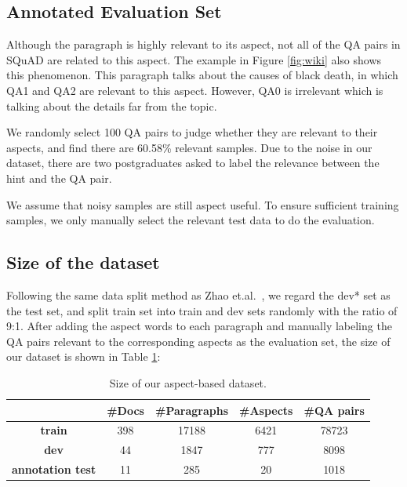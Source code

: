 \subsection{Annotated Evaluation Set}
Although the paragraph is highly relevant to its aspect, not all of the QA pairs in SQuAD are related to this aspect.
The example in Figure \ref{fig:wiki} also shows this phenomenon. 
This paragraph talks about the causes of black death, in which QA1 and QA2 are relevant to this aspect.
However, QA0 is irrelevant which is talking about the details far from the topic.

We randomly select 100 QA pairs to judge whether they are relevant to their aspects, and find there are 60.58\% relevant samples.
Due to the noise in our dataset, there are two postgraduates asked to label the relevance between the hint and the QA pair.

We assume that noisy samples are still aspect useful.
To ensure sufficient training samples, we only manually select the relevant test data to do the evaluation.

\subsection{Size of the dataset}
Following the same data split method as Zhao et.al.~,  we regard the dev* set as the test set, and split train set into train and dev sets randomly with the ratio of 9:1.
After adding the aspect words to each paragraph and manually labeling the QA pairs relevant to the corresponding aspects as the evaluation set, the size of our dataset is shown in Table \ref{tab:size}:
\begin{table}[th]
\scriptsize
\centering
\begin{tabular}{ccccc}
\hline
 & \textbf{\#Docs} & \textbf{\#Paragraphs} & \textbf{\#Aspects} & \textbf{\#QA pairs} \\ \hline
\textbf{train} & 398 & 17188 & 6421 & 78723 \\ 
\textbf{dev} & 44 & 1847 & 777 & 8098 \\ 
\textbf{annotation test} & 11 & 285 & 20 & 1018 \\ \hline
\end{tabular}
\caption{\label{tab:size} Size of our aspect-based dataset.}
\end{table}

